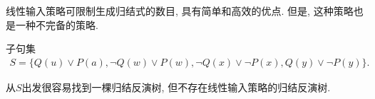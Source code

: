 线性输入策略可限制生成归结式的数目, 具有简单和高效的优点. 但是, 这种策略也是一种不完备的策略.
\begin{example}
子句集
\begin{align}
  S=\{Q(u)\vee P(a), \neg Q(w)\vee P(w), \neg Q(x)\vee \neg  P(x), Q(y)\vee \neg  P(y)\}.
\end{align}
\end{example}
从$S$出发很容易找到一棵归结反演树, 但不存在线性输入策略的归结反演树.
